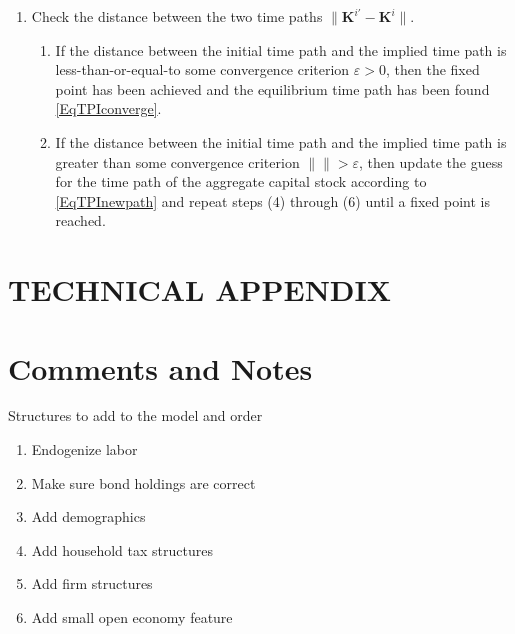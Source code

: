 \documentclass[letterpaper,12pt]{article}
\theoremstyle{definition}
\newcommand\ve{\varepsilon}
\providecommand{\norm}[1]{\lVert#1\rVert}
\begin{document}
\begin{enumerate}
\begin{enumerate}
      \end{enumerate}
    \item Check the distance between the two time paths $\norm{\bm{K}^{i'}-\bm{K}^i}$.
      \begin{enumerate}
        \item If the distance between the initial time path and the implied time path is less-than-or-equal-to some convergence criterion $\ve>0$, then the fixed point has been achieved and the equilibrium time path has been found \eqref{EqTPIconverge}.
        \item If the distance between the initial time path and the implied time path is greater than some convergence criterion $\norm{}>\ve$, then update the guess for the time path of the aggregate capital stock according to \eqref{EqTPInewpath} and repeat steps (4) through (6) until a fixed point is reached.
      \end{enumerate}
  \end{enumerate}

  \clearpage


\newpage




\newpage
\renewcommand{\theequation}{T.\arabic{section}.\arabic{equation}}
\renewcommand{\thesection}{T-\arabic{section}}   %
\setcounter{equation}{0}                         %
\setcounter{section}{0}                          %
\section*{TECHNICAL APPENDIX}


\section{Comments and Notes}\label{TAppComments}

  \noindent Structures to add to the model and order
  \begin{enumerate}
    \item Endogenize labor
    \item Make sure bond holdings are correct
    \item Add demographics
    \item Add household tax structures
    \item Add firm structures
    \item Add small open economy feature
  \end{enumerate}
\end{document}

